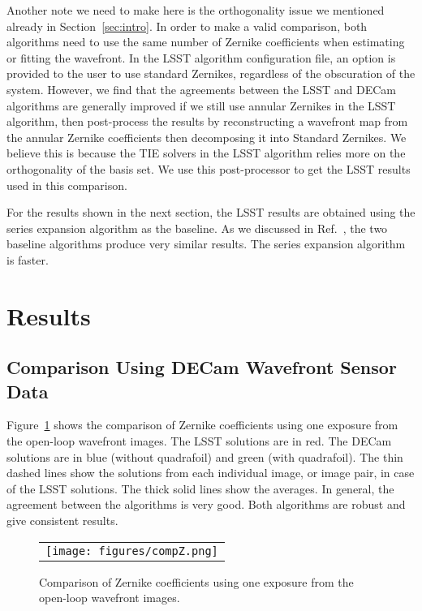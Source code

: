 \documentclass[]{spie}  %
\begin{document}
Another note we need to make here is the orthogonality issue we mentioned already in Section~\ref{sec:intro}.
In order to make a valid comparison, both algorithms need to use the same number of Zernike coefficients 
when estimating or fitting the wavefront.
In the LSST algorithm configuration file, an option is provided to the user to use standard Zernikes, regardless of the obscuration of the system. However, we find that the agreements between the LSST and DECam algorithms are generally improved if we still use annular Zernikes in the LSST algorithm, then post-process the results by reconstructing a wavefront map from the annular Zernike coefficients then decomposing 
it into Standard Zernikes. We believe this is because the TIE solvers in the LSST algorithm relies more on the orthogonality of the basis set.
We use this post-processor to get the LSST results used in this comparison.

For the results shown in the next section, the LSST results are obtained using the series expansion algorithm as the baseline. As we discussed in Ref.~, the two baseline algorithms produce very similar results. The series expansion algorithm is faster.

\section{Results}
\label{sec:results}

\subsection{Comparison Using DECam Wavefront Sensor Data}

Figure~\ref{fig:compZ} shows the comparison of Zernike coefficients using one exposure from the open-loop wavefront images. The LSST solutions are in red. The DECam solutions are in blue (without quadrafoil) and green (with quadrafoil). The thin dashed lines show the solutions from each individual image, or image pair, in case of the LSST solutions. The thick solid lines show the averages. In general, the agreement between the algorithms is very good. Both algorithms are robust and give consistent results.

   \begin{figure} [tphb]
   \begin{center}
   \begin{tabular}{c} %
   \texttt{[image: figures/compZ.png]}
   \end{tabular}
   \end{center}
   \caption[example] 
   { \label{fig:compZ} 
Comparison of Zernike coefficients using one exposure from the open-loop wavefront images. 
}
   \end{figure} 
\end{document}
